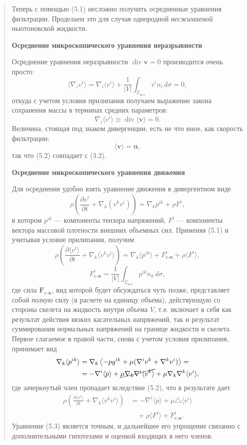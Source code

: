 \documentclass[12pt,a4paper]{article}
\DeclareMathOperator{\Div}{div}
\newcommand{\topic}[1]{\par\medskip\noindent\textbf{#1}\par\nobreak\smallskip}
\newenvironment{textquote}{\begin{quote}\sloppy}{\end{quote}}
\begin{document}
\begin{textquote}
Теперь с помощью (5.1) несложно получить осредненные уравнения фильтрации. Проделаем это для случая однородной \textit{несжимаемой} ньютоновской жидкости.

\topic{Осреднение микроскопического уравнения неразрывности}
Осреднение уравнения неразрывности $\Div\boldsymbol{v}=0$ производится очень просто:
\[
\langle\nabla_iv^i\rangle=\nabla_i\langle v^i\rangle+\frac{1}{|V|}\int_{\Sigma_{\text{ж-с}}}v^in_i\,d\sigma=0,
\]
откуда с учетом условия прилипания получаем выражение закона сохранения массы в терминах средних параметров:
\begin{equation}
\nabla_i\langle v^i\rangle\equiv\Div\langle\boldsymbol{v}\rangle=0.
\tag{5.2}\label{q3:eq-5-2}
\end{equation}
Величина, стоящая под знаком дивергенции, есть не что иное, как скорость фильтрации:
\[
\langle\boldsymbol{v}\rangle=\boldsymbol{u},
\]
так что (5.2) совпадает с (3.2).

\topic{Осреднение микроскопического уравнения движения}
Для осреднения удобно взять уравнение движения в дивергентном виде
\[
\rho\left(\frac{\partial v^i}{\partial t}+\nabla_k(v^kv^i)\right)=\nabla_kp^{ik}+\rho F^i,
\]
в котором $p^{ik}$ --- компоненты тензора напряжений, $F^i$ --- компоненты вектора массовой плотности внешних объемных сил. Применяя (5.1) и учитывая условие прилипания, получим
\[
\rho\left(\frac{\partial\langle v^i\rangle}{\partial t}+\nabla_k\langle v^kv^i\rangle\right)=\nabla_k\langle p^{ik}\rangle+F^i_{\text{с-ж}}+\rho\langle F^i\rangle,
\]
\[
F^i_{\text{с-ж}}=\frac{1}{|V|}\int_{\Sigma_{\text{ж-с}}}p^{ik}n_k\,d\sigma,
\]
где сила $\boldsymbol{F}_{\text{с-ж}}$, вид которой будет обсуждаться чуть позже, представляет собой \textit{полную} силу (в расчете на единицу объема), действующую со стороны скелета на жидкость внутри объема $V$, т.е. включает в себя как результат действия вязких касательных напряжений, так и результат суммирования нормальных напряжений на границе жидкости и скелета. Первое слагаемое в правой части, снова с учетом условия прилипания, принимает вид
\[
\begin{aligned}
\nabla_k\langle p^{ik}\rangle
&=\nabla_k\left\langle-pg^{ik}+\mu(\nabla^iv^k+\nabla^kv^i)\right\rangle=\\
&=-\nabla^i\langle p\rangle+\cancel{\mu\nabla_k\nabla^i\langle v^k\rangle}+\mu\nabla_k\nabla^k\langle v^i\rangle,
\end{aligned}
\]
где зачеркнутый член пропадает вследствие (5.2), что в результате дает
\begin{equation}
\begin{aligned}
\rho\left(\frac{\partial\langle v^i\rangle}{\partial t}+\nabla_k\langle v^kv^i\rangle\right)
&=-\nabla^i\langle p\rangle+\mu\triangle\langle v^i\rangle\\
&\quad+\rho\langle F^i\rangle+F^i_{\text{с-ж}}.
\end{aligned}
\tag{5.3}\label{q3:eq-5-3}
\end{equation}
Уравнение (5.3) является точным, и дальнейшее его упрощение связанно с дополнительными гипотезами и оценкой входящих в него членов.
\end{textquote}
\end{document}
